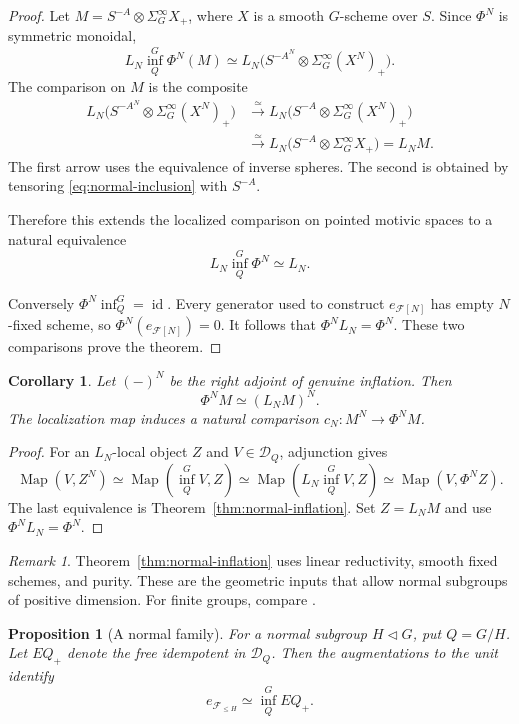 \documentclass[11pt,reqno]{amsart}
\newtheorem{proposition}[theorem]{Proposition}
\newtheorem{corollary}[theorem]{Corollary}
\theoremstyle{definition}
\theoremstyle{remark}
\newtheorem{remark}[theorem]{Remark}
\theoremstyle{plain}
\numberwithin{equation}{section}
\DeclareMathOperator{\Map}{Map}
\newcommand{\D}{\mathcal D}
\newcommand{\F}{\mathcal F}
\begin{document}
\begin{proof}
Let $M=S^{-A}\otimes\Sigma^\infty_GX_+$, where $X$ is a smooth
$G$-scheme over $S$. Since $\Phi^N$ is symmetric monoidal,
\[
  L_N\operatorname{inf}_Q^G\Phi^N(M)
  \simeq
  L_N\bigl(S^{-A^N}\otimes\Sigma^\infty_G(X^N)_+\bigr).
\]
The comparison on $M$ is the composite
\[
\begin{aligned}
  L_N\bigl(S^{-A^N}\otimes\Sigma^\infty_G(X^N)_+\bigr)
  &\xrightarrow{\simeq}
  L_N\bigl(S^{-A}\otimes\Sigma^\infty_G(X^N)_+\bigr)\\
  &\xrightarrow{\simeq}
  L_N\bigl(S^{-A}\otimes\Sigma^\infty_GX_+\bigr)
  =L_NM.
\end{aligned}
\]
The first arrow uses the equivalence of inverse spheres.
The second is obtained by tensoring
\eqref{eq:normal-inclusion} with $S^{-A}$.

Therefore this extends the
localized comparison on pointed motivic spaces to a natural
equivalence
\[
  L_N\operatorname{inf}_Q^G\Phi^N\simeq L_N.
\]

Conversely \(\Phi^N\operatorname{inf}_Q^G=\operatorname{id}\).
Every generator used to construct \(e_{\F[N]}\) has empty
\(N\)-fixed scheme, so \(\Phi^N(e_{\F[N]})=0\).
It follows that \(\Phi^NL_N=\Phi^N\).
These two comparisons prove the theorem.
\end{proof}

\begin{corollary}\label{cor:geometric-categorical-fixed}
Let \((-)^N\) be the right adjoint of genuine inflation.
Then
\[
 \Phi^N M\simeq(L_NM)^N.
\]
The localization map induces a natural comparison
\(c_N:M^N\to\Phi^N M\).
\end{corollary}
\begin{proof}
For an \(L_N\)-local object \(Z\) and \(V\in\D_Q\), adjunction gives
\[
 \Map(V,Z^N)
 \simeq\Map(\operatorname{inf}_Q^G V,Z)
 \simeq\Map(L_N\operatorname{inf}_Q^G V,Z)
 \simeq\Map(V,\Phi^N Z).
\]
The last equivalence is Theorem~\ref{thm:normal-inflation}.
Set \(Z=L_NM\) and use \(\Phi^N L_N=\Phi^N\).
\end{proof}

\begin{remark}
Theorem~\ref{thm:normal-inflation} uses linear reductivity, smooth
fixed schemes, and purity. These are the geometric inputs that allow
normal subgroups of positive dimension.
For finite groups, compare \cite[Propositions 4.8 and 4.10]{GH}.
\end{remark}

\begin{proposition}[A normal family]\label{prop:normal-family}
For a normal subgroup \(H\triangleleft G\), put \(Q=G/H\).
Let \(EQ_+\) denote the free idempotent in \(\D_Q\).
Then the augmentations to the unit identify
\[
 e_{\F_{\leq H}}\simeq\operatorname{inf}_Q^G EQ_+.
\]
\end{proposition}
\end{document}
